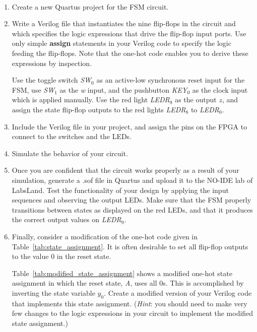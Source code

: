 \documentclass[epsfig,10pt,fullpage]{article}
\begin{document}
\begin{enumerate}
\item Create a new Quartus\textsuperscript{\textregistered} project for the FSM circuit. 

\item Write a Verilog file that instantiates the nine flip-flops in the circuit and which
specifies the logic expressions that drive the flip-flop input ports. Use only
simple {\bf assign} statements in your Verilog code to specify the logic feeding the
flip-flops. Note that the one-hot code enables you to derive these expressions by
inspection.

Use the toggle switch {\it SW}$_0$ as an active-low synchronous reset input
for the FSM, use {\it SW}$_1$ as the {\it w} input, and the pushbutton {\it KEY}$_0$ as the clock input which 
is applied manually.  Use the red light {\it LEDR}$_9$ as the output $z$, 
and assign the state flip-flop outputs to the red lights {\it LEDR}$_8$ to {\it LEDR}$_0$.

\item Include the Verilog file in your project, and assign the pins on the FPGA to 
connect to the switches and the LEDs.

\item Simulate the behavior of your circuit.

\item Once you are confident that the circuit works properly as a result of your
simulation, generate a .sof file in Quartus and upload it to the NO-IDE lab of LabsLand.  Test the functionality of your 
design by applying the input sequences and observing the output LEDs. Make sure that the
FSM properly transitions between states as displayed on the red LEDs, and that it produces
the correct output values on {\it LEDR}$_9$.

\item Finally, consider a modification of the one-hot code given in Table~\ref{tab:state_assignment}. It is often 
desirable to set all flip-flop outputs to the value 0 in the reset state.

Table~\ref{tab:modified_state_assignment} shows a modified one-hot state assignment in which the reset state, {\it A},
uses all 0s. This is accomplished by inverting the state variable $y_0$. 
Create a modified version of your Verilog code that implements this state
assignment. ({\it Hint}: you should need to make very few changes to the logic expressions
in your circuit to implement the modified state assignment.) 


\end{enumerate}
\end{document}
